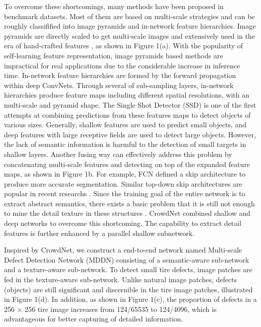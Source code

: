\documentclass{article}
\begin{document}
To overcome these shortcomings, many methods have been proposed in benchmark datasets. Most of them are based on multi-scale strategies and can be roughly classifified into image pyramids and in-network feature hierarchies. Image pyramids are directly scaled to get multi-scale images and extensively used in the era of hand-crafted features \cite{lowe2004distinctive,dalal2005histograms}, as shown in Figure 1(a). With the popularity of self-learning feature representation, image pyramids based methods are impractical for real applications due to the considerable increase in inference time. In-network feature hierarchies are formed by the forward propagation within deep ConvNets. Through several of sub-sampling layers, in-network hierarchies produce feature maps including different spatial resolutions, with an multi-scale and pyramid shape\cite{lin2017feature}. The Single Shot Detector (SSD) \cite{liu2016ssd} is one of the first attempts at combining predictions from these features maps to detect objects of various sizes. Generally, shallow features are used to predict small objects, and deep features with large receptive fields are used to detect large objects. However, the lack of semantic information is harmful to the detection of small targets in shallow layers. Another fusing way can effectively address this problem by concatenating multi-scale features and detecting on top of the expanded feature maps, as shown in Figure 1b. For example, FCN defined a skip architecture to produce more accurate segmentation. Similar top-down skip architectures are popular in recent researchs \cite{newell2016stacked,ghiasi2016laplacian}. Since the training goal of the entire network is to extract abstract semantics, there exists a basic problem that it is still not enough to mine the detail texture in these structures \cite{zhou2018scale}. CrowdNet \cite{boominathan2016crowdnet} combined shallow and deep networks to overcome this shortcoming. The capability to extract detail features is further enhanced by a parallel shallow subnetwork.

Inspired by CrowdNet, we construct a end-to-end network named Multi-scale Defect Detection Network (MDDN) consisting of a semantic-aware sub-network and a texture-aware sub-network. To detect small tire defects, image patches \cite{boominathan2016crowdnet,bai2018sod} are fed in the texture-aware sub-network. Unlike natural image patches, defects (objects) are still significant and discernible in the tire image patches, illustrated in Figure 1(d). In addition, as shown in Figure 1(c), the proportion of defects in a 256 $\times$ 256 tire image increases from 124/65535 to 124/4096, which is advantageous for better capturing of detailed information.
\end{document}
